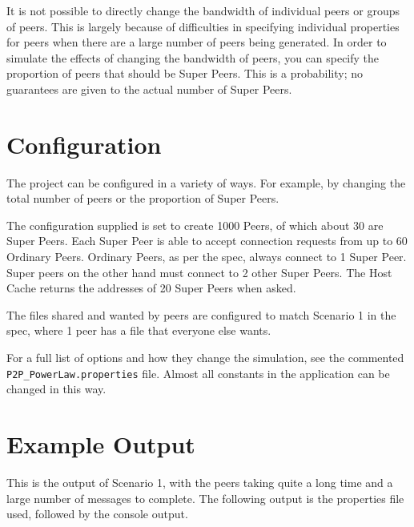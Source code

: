 It is not possible to directly change the bandwidth of individual peers or
groups of peers. This is largely because of difficulties in specifying
individual properties for peers when there are a large number of peers being
generated.  In order to simulate the effects of changing the bandwidth of
peers, you can specify the proportion of peers that should be Super Peers.
This is a probability; no guarantees are given to the actual number of Super
Peers.

\section{Configuration}

The project can be configured in a variety of ways. For example, by changing
the total number of peers or the proportion of Super Peers.

The configuration supplied is set to create 1000 Peers, of which about 30 are
Super Peers. Each Super Peer is able to accept connection requests from up to
60 Ordinary Peers. Ordinary Peers, as per the spec, always connect to 1 Super
Peer.  Super peers on the other hand must connect to 2 other Super Peers. The
Host Cache returns the addresses of 20 Super Peers when asked.

The files shared and wanted by peers are configured to match Scenario 1 in the
spec, where 1 peer has a file that everyone else wants.

For a full list of options and how they change the simulation, see the
commented \verb!P2P_PowerLaw.properties! file. Almost all constants in the
application can be changed in this way.

\section{Example Output}

This is the output of Scenario 1, with the peers taking quite a long time and a
large number of messages to complete. The following output is the properties
file used, followed by the console output.

\lstset{
  basicstyle=\footnotesize
}
\begin{multicols}{2}

\end{multicols}

